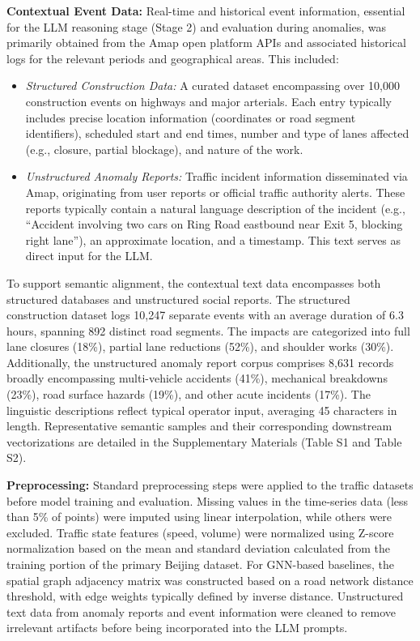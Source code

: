 \documentclass{article}
\begin{document}
\textbf{Contextual Event Data:} Real-time and historical event information, essential for the LLM reasoning stage (Stage 2) and evaluation during anomalies, was primarily obtained from the Amap open platform APIs and associated historical logs for the relevant periods and geographical areas. This included:
\begin{itemize}
    \item \textit{Structured Construction Data:} A curated dataset encompassing over 10,000 construction events on highways and major arterials. Each entry typically includes precise location information (coordinates or road segment identifiers), scheduled start and end times, number and type of lanes affected (e.g., closure, partial blockage), and nature of the work.
    \item \textit{Unstructured Anomaly Reports:} Traffic incident information disseminated via Amap, originating from user reports or official traffic authority alerts. These reports typically contain a natural language description of the incident (e.g., ``Accident involving two cars on Ring Road eastbound near Exit 5, blocking right lane''), an approximate location, and a timestamp. This text serves as direct input for the LLM.
\end{itemize}
To support semantic alignment, the contextual text data encompasses both structured databases and unstructured social reports. The structured construction dataset logs 10,247 separate events with an average duration of 6.3 hours, spanning 892 distinct road segments. The impacts are categorized into full lane closures (18\%), partial lane reductions (52\%), and shoulder works (30\%). Additionally, the unstructured anomaly report corpus comprises 8,631 records broadly encompassing multi-vehicle accidents (41\%), mechanical breakdowns (23\%), road surface hazards (19\%), and other acute incidents (17\%). The linguistic descriptions reflect typical operator input, averaging 45 characters in length. Representative semantic samples and their corresponding downstream vectorizations are detailed in the Supplementary Materials (Table S1 and Table S2).

\textbf{Preprocessing:} Standard preprocessing steps were applied to the traffic datasets before model training and evaluation. Missing values in the time-series data (less than 5\% of points) were imputed using linear interpolation, while others were excluded. Traffic state features (speed, volume) were normalized using Z-score normalization based on the mean and standard deviation calculated from the training portion of the primary Beijing dataset. For GNN-based baselines, the spatial graph adjacency matrix was constructed based on a road network distance threshold, with edge weights typically defined by inverse distance. Unstructured text data from anomaly reports and event information were cleaned to remove irrelevant artifacts before being incorporated into the LLM prompts.
\end{document}
